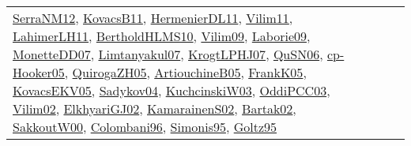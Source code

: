 {\begin{longtable}{lp{3cm}>{\raggedright}p{6cm}>{\raggedright}p{6cm}p{8cm}}
\href{papers/SerraNM12.pdf}{SerraNM12}\cite{SerraNM12}, \href{articles/KovacsB11.pdf}{KovacsB11}\cite{KovacsB11}, \href{papers/HermenierDL11.pdf}{HermenierDL11}\cite{HermenierDL11}, \href{papers/Vilim11.pdf}{Vilim11}\cite{Vilim11}, \href{papers/LahimerLH11.pdf}{LahimerLH11}\cite{LahimerLH11}, \href{papers/BertholdHLMS10.pdf}{BertholdHLMS10}\cite{BertholdHLMS10}, \href{papers/Vilim09.pdf}{Vilim09}\cite{Vilim09}, \href{papers/Laborie09.pdf}{Laborie09}\cite{Laborie09}, \href{papers/MonetteDD07.pdf}{MonetteDD07}\cite{MonetteDD07}, \href{papers/Limtanyakul07.pdf}{Limtanyakul07}\cite{Limtanyakul07}, \href{papers/KrogtLPHJ07.pdf}{KrogtLPHJ07}\cite{KrogtLPHJ07}, \href{papers/QuSN06.pdf}{QuSN06}\cite{QuSN06}, \href{papers/cp-Hooker05.pdf}{cp-Hooker05}\cite{cp-Hooker05}, \href{papers/QuirogaZH05.pdf}{QuirogaZH05}\cite{QuirogaZH05}, \href{papers/ArtiouchineB05.pdf}{ArtiouchineB05}\cite{ArtiouchineB05}, \href{papers/FrankK05.pdf}{FrankK05}\cite{FrankK05}, \href{papers/KovacsEKV05.pdf}{KovacsEKV05}\cite{KovacsEKV05}, \href{papers/Sadykov04.pdf}{Sadykov04}\cite{Sadykov04}, \href{articles/KuchcinskiW03.pdf}{KuchcinskiW03}\cite{KuchcinskiW03}, \href{papers/OddiPCC03.pdf}{OddiPCC03}\cite{OddiPCC03}, \href{papers/Vilim02.pdf}{Vilim02}\cite{Vilim02}, \href{papers/ElkhyariGJ02.pdf}{ElkhyariGJ02}\cite{ElkhyariGJ02}, \href{papers/KamarainenS02.pdf}{KamarainenS02}\cite{KamarainenS02}, \href{papers/Bartak02.pdf}{Bartak02}\cite{Bartak02}, \href{articles/SakkoutW00.pdf}{SakkoutW00}\cite{SakkoutW00}, \href{papers/Colombani96.pdf}{Colombani96}\cite{Colombani96}, \href{papers/Simonis95.pdf}{Simonis95}\cite{Simonis95}, \href{papers/Goltz95.pdf}{Goltz95}\cite{Goltz95}\\

\end{longtable}}
